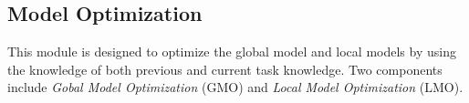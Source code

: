 \subsection{Model Optimization}
This module is designed to optimize the global model and local models by using the knowledge of both previous and current task knowledge.
Two components include \textit{Gobal Model Optimization} (GMO) and \textit{Local Model Optimization} (LMO).


